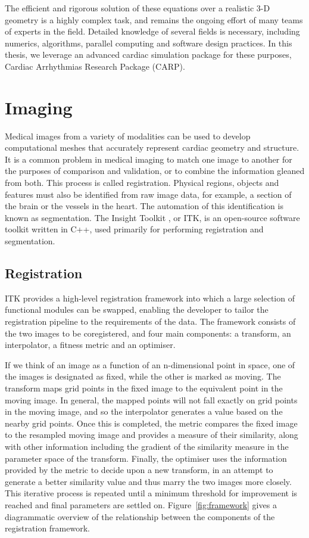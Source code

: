   The efficient and rigorous solution of these equations over a realistic 3-D geometry is a highly complex task, and remains the ongoing effort of many teams of experts in the field. Detailed knowledge of several fields is necessary, including numerics, algorithms, parallel computing and software design practices. In this thesis, we leverage an advanced cardiac simulation package for these purposes, Cardiac Arrhythmias Research Package (CARP).

\section{Imaging}
\label{imaging}
  Medical images from a variety of modalities can be used to develop computational meshes that accurately represent cardiac geometry and structure. It is a common problem in medical imaging to match one image to another for the purposes of comparison and validation, or to combine the information gleaned from both. This process is called registration. Physical regions, objects and features must also be identified from raw image data, for example, a section of the brain or the vessels in the heart. The automation of this identification is known as segmentation. The Insight Toolkit \cite{Yoo2002}, or ITK, is an open-source software toolkit written in C++, used primarily for performing registration and segmentation.
  
  \subsection{Registration} %
  \label{sub:registration}
    ITK provides a high-level registration framework into which a large selection of functional modules can be swapped, enabling the developer to tailor the registration pipeline to the requirements of the data. The framework consists of the two images to be coregistered, and four main components: a transform, an interpolator, a fitness metric and an optimiser.

    If we think of an image as a function of an n-dimensional point in space, one of the images is designated as fixed, while the other is marked as moving. The transform maps grid points in the fixed image to the equivalent point in the moving image. In general, the mapped points will not fall exactly on grid points in the moving image, and so the interpolator generates a value based on the nearby grid points. Once this is completed, the metric compares the fixed image to the resampled moving image and provides a measure of their similarity, along with other information including the gradient of the similarity measure in the parameter space of the transform. Finally, the optimiser uses the information provided by the metric to decide upon a new transform, in an attempt to generate a better similarity value and thus marry the two images more closely. This iterative process is repeated until a minimum threshold for improvement is reached and final parameters are settled on. Figure~\ref{fig:framework} gives a diagrammatic overview of the relationship between the components of the registration framework.

